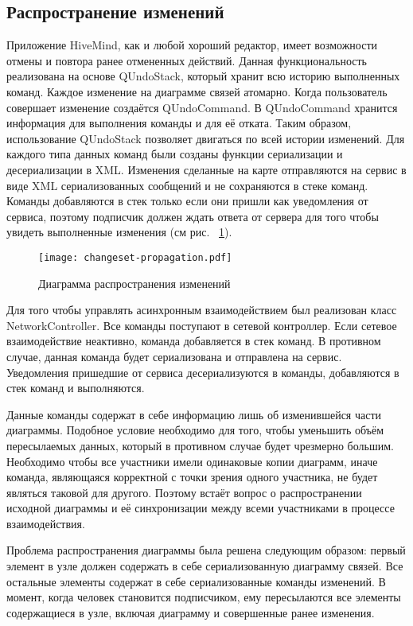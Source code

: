 \subsection{Распространение изменений}
\label{sec:changeset_propagation}
Приложение HiveMind, как и любой хороший редактор, имеет возможности отмены и
повтора ранее отмененных действий. Данная функциональность реализована на основе
QUndoStack, который хранит всю историю выполненных команд. Каждое изменение на
диаграмме связей атомарно. Когда пользователь совершает изменение создаётся
QUndoCommand. В QUndoCommand хранится информация для выполнения команды и для её
отката. Таким образом, использование QUndoStack позволяет двигаться по всей
истории изменений. Для каждого типа данных команд были созданы функции
сериализации и десериализации в XML. Изменения сделанные на карте отправляются
на сервис в виде XML сериализованных сообщений и не сохраняются в стеке команд.
Команды добавляются в стек только если они пришли как уведомления от сервиса,
поэтому подписчик должен ждать ответа от сервера для того чтобы увидеть
выполненные изменения (см рис. ~\ref{img:changeset_propagation}).

\begin{figure}
  \centering
  \texttt{[image: changeset-propagation.pdf]}
  \caption{Диаграмма распространения изменений}
  \label{img:changeset_propagation}
\end{figure}

Для того чтобы управлять асинхронным взаимодействием был реализован класс
NetworkController. Все команды поступают в сетевой контроллер. Если сетевое
взаимодействие неактивно, команда добавляется в стек команд. В противном
случае, данная команда будет сериализована и отправлена на сервис. Уведомления
пришедшие от сервиса десериализуются в команды, добавляются в стек команд и
выполняются.

Данные команды содержат в себе информацию лишь об изменившейся части диаграммы.
Подобное условие необходимо для того, чтобы уменьшить объём пересылаемых данных,
который в противном случае будет чрезмерно большим. Необходимо чтобы все
участники имели одинаковые копии диаграмм, иначе команда, являющаяся корректной
с точки зрения одного участника, не будет являться таковой для другого. Поэтому
встаёт вопрос о распространении исходной диаграммы и её синхронизации между
всеми участниками в процессе взаимодействия.

Проблема распространения диаграммы была решена следующим образом: первый элемент
в узле должен содержать в себе сериализованную диаграмму связей. Все остальные
элементы содержат в себе сериализованные команды изменений. В момент, когда
человек становится подписчиком, ему пересылаются все элементы содержащиеся в
узле, включая диаграмму и совершенные ранее изменения.

